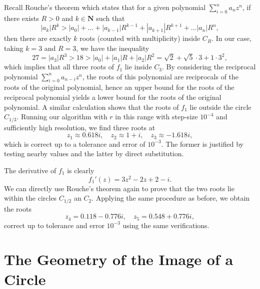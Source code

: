 \documentclass{article}
\begin{document}
Recall Rouche's theorem which states that for a given polynomial \( \sum_{i=0}^n a_nz^n\), if there exists \(R > 0\) and \(k \in \mathbf{N}\) such that
\[ |a_k|R^k > |a_0| + \dots + |a_{k-1}|R^{k-1} + |a_{k+1}|R^{k+1} + \dots |a_n|R^n, \]
then there are exactly \(k\) roots (counted with multiplicity) inside \(C_R\). In our case, taking \(k = 3\) and \(R = 3\), we have the inequality
\[ 27 = |a_3|R^3 > 18 > |a_0| + |a_1|R + |a_2|R^2 = \sqrt{2} + \sqrt{5}\cdot3 + 1\cdot3^2, \]
which implies that all three roots of \(f_1\) lie inside \(C_3\). By considering the reciprocal polynomial \(\sum_{i=0}^n a_{n-i}z^n\), the roots of this polynomial are reciprocals of the roots of the original polynomial, hence an upper bound for the roots of the reciprocal polynomial yields a lower bound for the roots of the original polynomial. A similar calculation shows that the roots of \(f_1\) lie outside the circle \(C_{1/3}\). Running our algorithm with \(r\) in this range with step-size \(10^{-4}\) and sufficiently high resolution, we find three roots at
\[ z_1 \approx 0.618i, \quad z_2 \approx 1+i, \quad z_3 \approx -1.618i, \]
which is correct up to a tolerance and error of \(10^{-3}\). The former is justified by testing nearby values and the latter by direct substitution.

The derivative of \(f_1\) is clearly
\[ f_1'(z) = 3z^2 - 2z + 2 - i. \]
We can directly use Rouche's theorem again to prove that the two roots lie within the circles \(C_{1/2}\) an \(C_2\). Applying the same procedure as before, we obtain the roots
\[ z_4 = 0.118 - 0.776i, \quad z_5 = 0.548 + 0.776i, \]
correct up to tolerance and error \(10^{-3}\) using the same verifications.

\section{The Geometry of the Image of a Circle}
\end{document}
